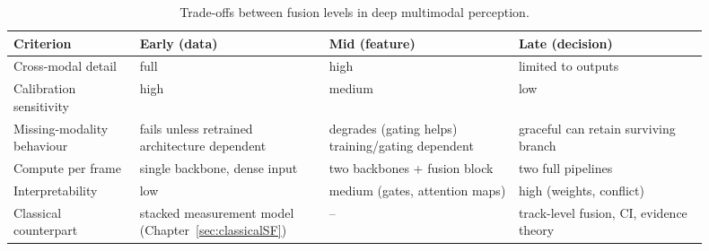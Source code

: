 \documentclass[graybox,envcountchap]{style/SNmono}
\providecommand{\DIFadd}[1]{{\protect\color{blue} #1}} %
\providecommand{\DIFdel}[1]{{\protect\color{red} #1}} %
\providecommand{\DIFaddFL}[1]{\DIFadd{#1}} %
\providecommand{\DIFdelFL}[1]{\DIFdel{#1}} %
\providecommand{\DIFaddbeginFL}{} %
\providecommand{\DIFaddendFL}{} %
\providecommand{\DIFdelbeginFL}{} %
\providecommand{\DIFdelendFL}{} %
\begin{document}
\begin{table}[!t]
    \centering
    \renewcommand{\arraystretch}{1.25}
    \small
    \setlength{\tabcolsep}{4pt}
    \caption{Trade-offs between fusion levels in deep multimodal perception.}
    \label{tab:fusion-level-tradeoff}
    \DIFdelbeginFL %
\DIFdelendFL \DIFaddbeginFL \begin{tabular}{p{0.16\linewidth} p{0.245\linewidth} p{0.245\linewidth} p{0.245\linewidth}}
        \DIFaddendFL \hline
        \textbf{Criterion} & \textbf{Early (data)} & \textbf{Mid (feature)} & \textbf{Late (decision)} \\
        \hline
        Cross-modal detail & full & high & limited to outputs \\
        Calibration sensitivity & high & medium & low \\
        Missing-modality behaviour & \DIFdelbeginFL \DIFdelFL{fails unless retrained }\DIFdelendFL \DIFaddbeginFL \DIFaddFL{architecture dependent }\DIFaddendFL & \DIFdelbeginFL \DIFdelFL{degrades (gating helps) }\DIFdelendFL \DIFaddbeginFL \DIFaddFL{training/gating dependent }\DIFaddendFL & \DIFdelbeginFL \DIFdelFL{graceful }\DIFdelendFL \DIFaddbeginFL \DIFaddFL{can retain surviving branch }\DIFaddendFL \\
        Compute per frame & single backbone, dense input & two backbones + fusion block & two full pipelines \\
        Interpretability & low & medium (gates, attention maps) & high (weights, conflict) \\
        Classical counterpart & stacked measurement model (Chapter~\ref{sec:classicalSF}) & -- & track-level fusion, CI, evidence theory \\
        \hline
    \end{tabular}
\end{table}
\end{document}
